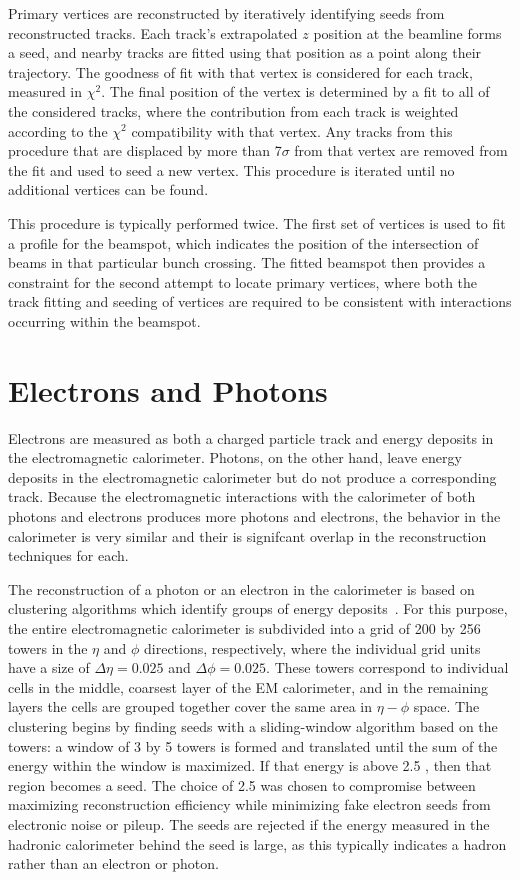 Primary vertices are reconstructed by iteratively identifying seeds from reconstructed tracks.
Each track's extrapolated $z$ position at the beamline forms a seed, and nearby tracks are fitted using that position as a point along their trajectory.
The goodness of fit with that vertex is considered for each track, measured in $\chi^2$. 
The final position of the vertex is determined by a fit to all of the considered tracks, where the contribution from each track is weighted according to the $\chi^2$ compatibility with that vertex.
Any tracks from this procedure that are displaced by more than 7$\sigma$ from that vertex are removed from the fit and used to seed a new vertex.
This procedure is iterated until no additional vertices can be found.

This procedure is typically performed twice.
The first set of vertices is used to fit a profile for the beamspot, which indicates the position of the intersection of beams in that particular bunch crossing.
The fitted beamspot then provides a constraint for the second attempt to locate primary vertices, where both the track fitting and seeding of vertices are required to be consistent with interactions occurring within the beamspot.


\section{Electrons and Photons}
\label{sec:egamma}

Electrons are measured as both a charged particle track and energy deposits in the electromagnetic calorimeter.
Photons, on the other hand, leave energy deposits in the electromagnetic calorimeter but do not produce a corresponding track.
Because the electromagnetic interactions with the calorimeter of both photons and electrons produces more photons and electrons, the behavior in the calorimeter is very similar and their is signifcant overlap in the reconstruction techniques for each.

The reconstruction of a photon or an electron in the calorimeter is based on clustering algorithms which identify groups of energy deposits~\cite{PERF-2013-03}.
For this purpose, the entire electromagnetic calorimeter is subdivided into a grid of 200 by 256 towers in the $\eta$ and $\phi$ directions, respectively, where the individual grid units have a size of $\Delta\eta = 0.025$ and $\Delta\phi = 0.025$.
These towers correspond to individual cells in the middle, coarsest layer of the \ac{EM} calorimeter, and in the remaining layers the cells are grouped together cover the same area in $\eta-\phi$ space.
The clustering begins by finding seeds with a sliding-window algorithm based on the towers: a window of 3 by 5 towers is formed and translated until the sum of the energy within the window is maximized.
If that energy is above 2.5 \GeV, then that region becomes a seed.
The choice of 2.5 \GeV was chosen to compromise between maximizing reconstruction efficiency while minimizing fake electron seeds from electronic noise or pileup.
The seeds are rejected if the energy measured in the hadronic calorimeter behind the seed is large, as this typically indicates a hadron rather than an electron or photon.

